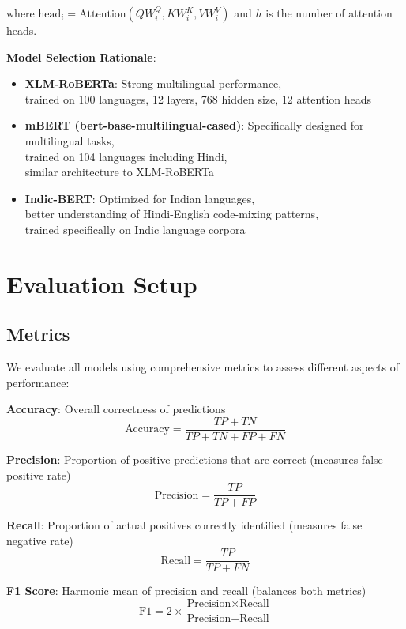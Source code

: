 \documentclass[11pt]{article}
\begin{document}
where $\text{head}_i = \text{Attention}(QW_i^Q, KW_i^K, VW_i^V)$ and $h$ is the number of attention heads.

\textbf{Model Selection Rationale}:
\begin{itemize}
\item \textbf{XLM-RoBERTa}: Strong multilingual performance,\\ trained on 100 languages, 12 layers, 768 hidden size, 12 attention heads
\item \textbf{mBERT (bert-base-multilingual-cased)}: Specifically designed for multilingual tasks,\\ trained on 104 languages including Hindi,\\ similar architecture to XLM-RoBERTa
\item \textbf{Indic-BERT}: Optimized for Indian languages,\\ better understanding of Hindi-English code-mixing patterns,\\ trained specifically on Indic language corpora
\end{itemize}

\section{Evaluation Setup}

\subsection{Metrics}

We evaluate all models using comprehensive metrics to assess different aspects of performance:

\textbf{Accuracy}: Overall correctness of predictions
\begin{equation}
\text{Accuracy} = \frac{TP + TN}{TP + TN + FP + FN}
\end{equation}

\textbf{Precision}: Proportion of positive predictions that are correct (measures false positive rate)
\begin{equation}
\text{Precision} = \frac{TP}{TP + FP}
\end{equation}

\textbf{Recall}: Proportion of actual positives correctly identified (measures false negative rate)
\begin{equation}
\text{Recall} = \frac{TP}{TP + FN}
\end{equation}

\textbf{F1 Score}: Harmonic mean of precision and recall (balances both metrics)
\begin{equation}
\text{F1} = 2 \times \frac{\text{Precision} \times \text{Recall}}{\text{Precision} + \text{Recall}}
\end{equation}
\end{document}
